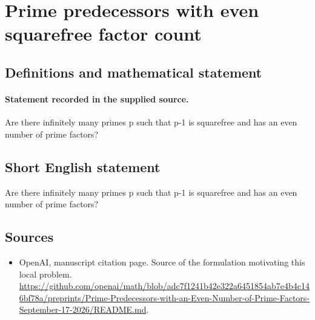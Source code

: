 \documentclass[11pt]{article}
\begin{document}
\section*{Prime predecessors with even squarefree factor count}\label{30007275}
\subsection{Definitions and mathematical statement}
\paragraph{Statement recorded in the supplied source.}
Are there infinitely many primes p such that p-1 is squarefree and has an even number of prime factors?
\subsection{Short English statement}
Are there infinitely many primes p such that p-1 is squarefree and has an even number of prime factors?
\subsection{Sources}
\begin{itemize}
\item[S1] OpenAI, manuscript citation page. Source of the formulation motivating this local problem.
\url{https://github.com/openai/math/blob/adc7f1241b42e322a6451854ab7e4b4c146bf78a/preprints/Prime-Predecessors-with-an-Even-Number-of-Prime-Factors-September-17-2026/README.md}.
\end{itemize}
\end{document}
